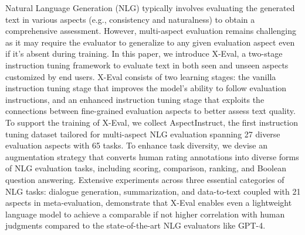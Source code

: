 Natural Language Generation (NLG) typically involves evaluating the generated text in various aspects (e.g., consistency and naturalness) to obtain a comprehensive assessment. However, multi-aspect evaluation remains challenging as it may require the evaluator to generalize to any given evaluation aspect even if it's absent during training. In this paper, we introduce X-Eval, a two-stage instruction tuning framework to evaluate text in both seen and unseen aspects customized by end users. X-Eval consists of two learning stages: the vanilla instruction tuning stage that improves the model's ability to follow evaluation instructions, and an enhanced instruction tuning stage that exploits the connections between fine-grained evaluation aspects to better assess text quality. To support the training of X-Eval, we collect AspectInstruct, the first instruction tuning dataset tailored for multi-aspect NLG evaluation spanning 27 diverse evaluation aspects with 65 tasks. To enhance task diversity, we devise an augmentation strategy that converts human rating annotations into diverse forms of NLG evaluation tasks, including scoring, comparison, ranking, and Boolean question answering. Extensive experiments across three essential categories of NLG tasks: dialogue generation, summarization, and data-to-text coupled with 21 aspects in meta-evaluation, demonstrate that X-Eval enables even a lightweight language model to achieve a comparable if not higher correlation with human judgments compared to the state-of-the-art NLG evaluators like GPT-4.